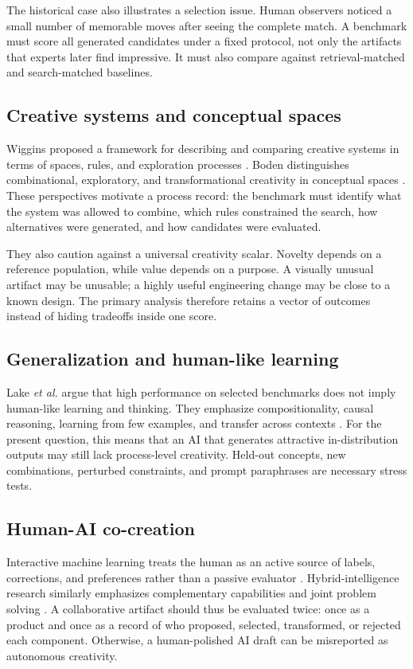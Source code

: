\documentclass[conference]{IEEEtran}
\begin{document}
The historical case also illustrates a selection issue. Human observers noticed a
small number of memorable moves after seeing the complete match. A benchmark must score
all generated candidates under a fixed protocol, not only the artifacts that experts
later find impressive. It must also compare against retrieval-matched and search-matched
baselines.

\subsection{Creative systems and conceptual spaces}

Wiggins proposed a framework for describing and comparing creative systems in terms of
spaces, rules, and exploration processes \cite{wiggins2006}. Boden distinguishes
combinational, exploratory, and transformational creativity in conceptual spaces
\cite{boden2004}. These perspectives motivate a process record: the benchmark must
identify what the system was allowed to combine, which rules constrained the search,
how alternatives were generated, and how candidates were evaluated.

They also caution against a universal creativity scalar. Novelty depends on a reference
population, while value depends on a purpose. A visually unusual artifact may be
unusable; a highly useful engineering change may be close to a known design. The primary
analysis therefore retains a vector of outcomes instead of hiding tradeoffs inside one
score.

\subsection{Generalization and human-like learning}

Lake \emph{et al.} argue that high performance on selected benchmarks does not imply
human-like learning and thinking. They emphasize compositionality, causal reasoning,
learning from few examples, and transfer across contexts \cite{lake2017}. For the
present question, this means that an AI that generates attractive in-distribution
outputs may still lack process-level creativity. Held-out concepts, new combinations,
perturbed constraints, and prompt paraphrases are necessary stress tests.

\subsection{Human-AI co-creation}

Interactive machine learning treats the human as an active source of labels, corrections,
and preferences rather than a passive evaluator \cite{amershi2014}. Hybrid-intelligence
research similarly emphasizes complementary capabilities and joint problem solving
\cite{dellermann2019}. A collaborative artifact should thus be evaluated twice: once as
a product and once as a record of who proposed, selected, transformed, or rejected each
component. Otherwise, a human-polished AI draft can be misreported as autonomous
creativity.
\end{document}

